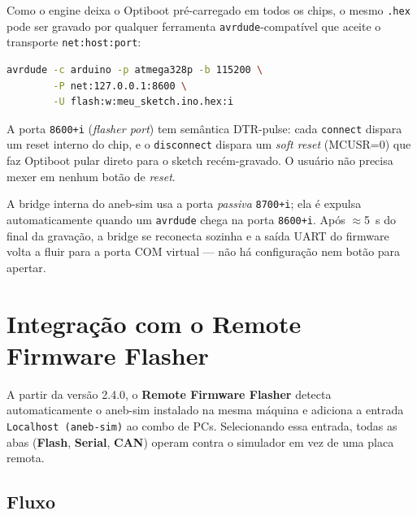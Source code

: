 \documentclass[12pt,a4paper]{article}
\begin{document}
Como o engine deixa o Optiboot pré-carregado em todos os chips, o
mesmo \texttt{.hex} pode ser gravado por qualquer ferramenta
\texttt{avrdude}-compatível que aceite o transporte
\texttt{net:host:port}:

\begin{lstlisting}[language=bash]
avrdude -c arduino -p atmega328p -b 115200 \
        -P net:127.0.0.1:8600 \
        -U flash:w:meu_sketch.ino.hex:i
\end{lstlisting}

A porta \texttt{8600+i} (\emph{flasher port}) tem semântica
DTR-pulse: cada \texttt{connect} dispara um reset interno do chip,
e o \texttt{disconnect} dispara um \emph{soft reset} (MCUSR=0) que
faz Optiboot pular direto para o sketch recém-gravado. O usuário
não precisa mexer em nenhum botão de \emph{reset}.

\begin{notabox}
A bridge interna do aneb-sim usa a porta \emph{passiva}
\texttt{8700+i}; ela é expulsa automaticamente quando um
\texttt{avrdude} chega na porta \texttt{8600+i}. Após $\approx$5~s
do final da gravação, a bridge se reconecta sozinha e a saída UART
do firmware volta a fluir para a porta COM virtual --- não há
configuração nem botão para apertar.
\end{notabox}

\section{Integração com o Remote Firmware Flasher}

A partir da versão 2.4.0, o \textbf{Remote Firmware Flasher}
detecta automaticamente o aneb-sim instalado na mesma máquina e
adiciona a entrada \texttt{Localhost (aneb-sim)} ao combo de PCs.
Selecionando essa entrada, todas as abas (\textbf{Flash},
\textbf{Serial}, \textbf{CAN}) operam contra o simulador em vez
de uma placa remota.

\subsection{Fluxo}
\end{document}
